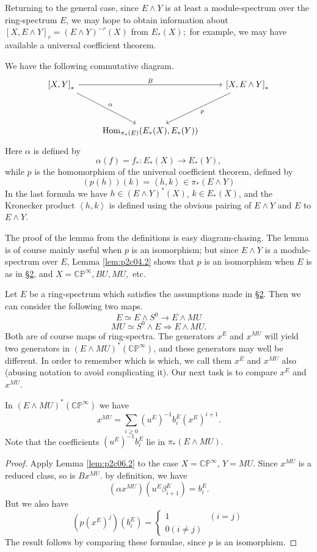 \documentclass[../main]{subfiles}
\begin{document}
Returning to the general case, since $E\wedge Y$ is at least a module-spectrum over the ring-spectrum $E$, we may hope to obtain information about $[X,E\wedge Y]_r=(E\wedge Y)^{-r}(X)$ from $E_\ast(X);$ for example, we may have available a universal coefficient theorem.

\begin{lemma}
\label{lem:p2c06.2}
We have the following commutative diagram.
$$\begin{tikzcd}
\left[X,Y\right]_\ast && \left[X,E\wedge Y\right]_\ast \\
\\
&\operatorname{Hom}_{\pi_\ast(E)}(E_\ast(X),E_\ast(Y))
\arrow["\alpha", from=1-1, to=3-2]
\arrow["B", from=1-1, to=1-3]
\arrow["p", from=1-3, to=3-2]
\end{tikzcd}$$
Here $\alpha$ is defined by 
$$\alpha(f)=f_\ast:E_\ast(X)\longrightarrow E_\ast(Y),$$
while $p$ is the homomorphism of the universal coefficient theorem, defined by 
$$(p(h))(k)=\left<h,k\right>\in \pi_\ast(E\wedge Y)$$
In the last formula we have $h\in(E\wedge Y)^\ast(X)$, $k\in E_\ast(X)$, and the Kronecker product $\left<h,k\right>$ is defined using the obvious pairing of $E\wedge Y$ and $E$ to $E\wedge Y$.
\end{lemma}

The proof of the lemma from the definitions is easy diagram-chasing. The lemma is of course mainly useful when $p$ is an isomorphism; but since $E\wedge Y$ is a module-spectrum over $E$, Lemma \ref{lem:p2c04.2} shows that $p$ is an isomorphism when $E$ is as in \hyperref[sec:p2c2]{\S 2}, and $X=\mathbb{CP}^\infty, BU, MU,$ etc.

Let $E$ be a ring-spectrum which satisfies the assumptions made in \hyperref[sec:p2c2]{\S 2}. Then we can consider the following two maps.
$$E\simeq E\wedge S^0\longrightarrow E\wedge MU$$
$$MU\simeq S^0\wedge E\Longrightarrow E\wedge MU.$$
Both are of course maps of ring-spectra. The generators $x^E$ and $x^{MU}$ will yield two generators in $(E\wedge MU)^\ast(\mathbb{CP}^\infty)$, and these generators may well be different. In order to remember which is which, we call them $x^E$ and $x^{MU}$ also (abusing notation to avoid complicating it). Our next task is to compare $x^E$ and $x^{MU}$.
\begin{lemma}
\label{lem:p2c06.3}
In $(E\wedge MU)^\ast(\mathbb{CP}^\infty)$ we have 
$$x^{MU}=\sum_{i\geq 0}\left(u^E\right)^{-1}b_i^E\left(x^E\right)^{i+1}.$$
Note that the coefficients $\left(u^E\right)^{-1}b_i^E$ lie in $\pi_\ast(E\wedge MU).$
\end{lemma}
\begin{proof}
Apply Lemma \ref{lem:p2c06.2} to the case $X=\mathbb{CP}^\infty$, $Y=MU$. Since $x^{MU}$ is a reduced class, so is $Bx^{MU}.$ by definition, we have 
$$\left(\alpha x^{MU}\right)\left(u^E\beta_{i+1}^E\right)=b_i^E.$$
But we also have 
$$\left(p\left(x^E\right)^j\right)\left(b_i^E\right)=\begin{cases}1 & (i=j) \\ 0 (i\neq j)\end{cases}$$
The result follows by comparing these formulae, since $p$ is an isomorphism. 
\end{proof}
\end{document}
